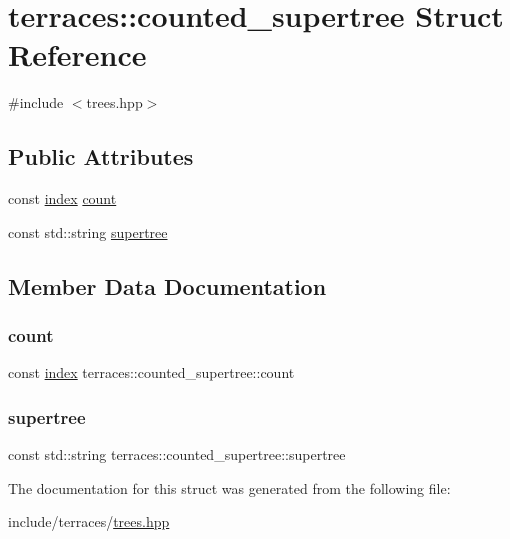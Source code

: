 \hypertarget{structterraces_1_1counted__supertree}{}\section{terraces\+:\+:counted\+\_\+supertree Struct Reference}
\label{structterraces_1_1counted__supertree}


{\ttfamily \#include $<$trees.\+hpp$>$}

\subsection*{Public Attributes}
\begin{DoxyCompactItemize}
\item 
const \hyperlink{namespaceterraces_adbc33ccb543d1634e96d0eb02e472c77}{index} \hyperlink{structterraces_1_1counted__supertree_a0ba6a52d09a0b572d1821d852a210f11}{count}
\item 
const std\+::string \hyperlink{structterraces_1_1counted__supertree_aa36892e795125017ec7a2efc27bfc673}{supertree}
\end{DoxyCompactItemize}


\subsection{Member Data Documentation}
\mbox{\label{structterraces_1_1counted__supertree_a0ba6a52d09a0b572d1821d852a210f11}} 
\subsubsection{\texorpdfstring{count}{count}}
{\footnotesize\ttfamily const \hyperlink{namespaceterraces_adbc33ccb543d1634e96d0eb02e472c77}{index} terraces\+::counted\+\_\+supertree\+::count}

\mbox{\label{structterraces_1_1counted__supertree_aa36892e795125017ec7a2efc27bfc673}} 
\subsubsection{\texorpdfstring{supertree}{supertree}}
{\footnotesize\ttfamily const std\+::string terraces\+::counted\+\_\+supertree\+::supertree}



The documentation for this struct was generated from the following file\+:\begin{DoxyCompactItemize}
\item 
include/terraces/\hyperlink{trees_8hpp}{trees.\+hpp}\end{DoxyCompactItemize}
